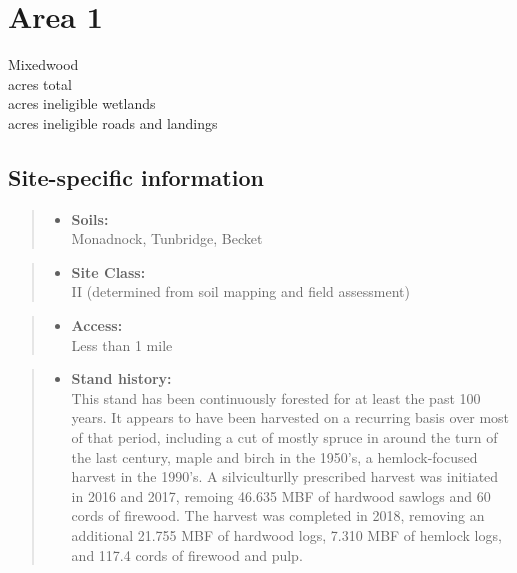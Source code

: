 \documentclass[]{tufte-handout}
\providecommand{\tightlist}{%
  \setlength{\itemsep}{0pt}\setlength{\parskip}{0pt}}
\begin{document}
\newpage

\section{Area 1}\label{area-1}

Mixedwood\\
 acres total\\
 acres ineligible wetlands\\
 acres ineligible roads and landings

\subsection{Site-specific information}\label{site-specific-information}

\begin{quote}
\begin{itemize}
\tightlist
\item
  \textbf{Soils:}\\
  \indent\indent Monadnock, Tunbridge, Becket
\end{itemize}
\end{quote}

\begin{quote}
\begin{itemize}
\tightlist
\item
  \textbf{Site Class:}\\
  \vspace{2pt} II (determined from soil mapping and field assessment)
\end{itemize}
\end{quote}

\begin{quote}
\begin{itemize}
\tightlist
\item
  \textbf{Access:}\\
  \vspace{2pt} Less than 1 mile
\end{itemize}
\end{quote}

\begin{quote}
\begin{itemize}
\tightlist
\item
  \textbf{Stand history:}\\
  \vspace{2pt} This stand has been continuously forested for at least
  the past 100 years. It appears to have been harvested on a recurring
  basis over most of that period, including a cut of mostly spruce in
  around the turn of the last century, maple and birch in the 1950's, a
  hemlock-focused harvest in the 1990's. A silviculturlly prescribed
  harvest was initiated in 2016 and 2017, remoing 46.635 MBF of hardwood
  sawlogs and 60 cords of firewood. The harvest was completed in 2018,
  removing an additional 21.755 MBF of hardwood logs, 7.310 MBF of
  hemlock logs, and 117.4 cords of firewood and pulp.
\end{itemize}
\end{quote}
\end{document}
